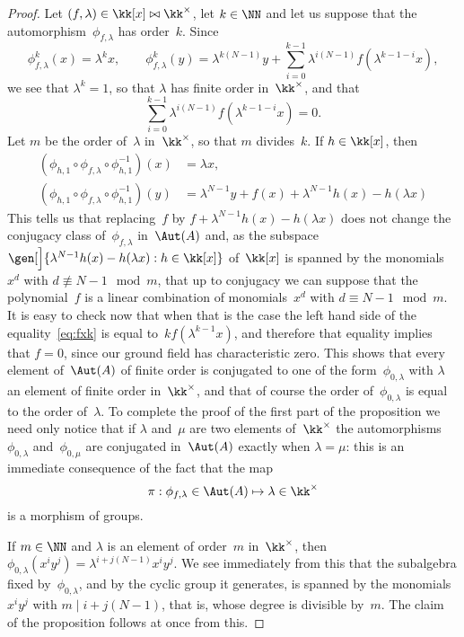 \begin{proof}
Let $(f,\lambda)\in\kk[x]\bowtie\kk^\times$, let $k\in\NN$ and let us
suppose that the automorphism~$\phi_{f,\lambda}$ has order~$k$. Since
  \[
  \phi_{f,\lambda}^k(x) = \lambda^kx,
  \qquad
  \phi_{f,\lambda}^k(y) = \lambda^{k(N-1)}y
        + \sum_{i=0}^{k-1}\lambda^{i(N-1)}f(\lambda^{k-1-i}x),
  \]
we see that $\lambda^k=1$, so that $\lambda$ has finite order
in~$\kk^\times$, and that 
  \[ \label{eq:fxk}
  \sum_{i=0}^{k-1}\lambda^{i(N-1)}f(\lambda^{k-1-i}x) = 0.
  \]
Let $m$ be the order of~$\lambda$ in~$\kk^\times$, so that $m$ divides~$k$.
If $h\in\kk[x]$, then
  \begin{align}
  (\phi_{h,1}\circ\phi_{f,\lambda}\circ\phi_{h,1}^{-1})(x)
    &= \lambda x,
    \\
  (\phi_{h,1}\circ\phi_{f,\lambda}\circ\phi_{h,1}^{-1})(y)
    &= \lambda^{N-1}y+f(x)+\lambda^{N-1}h(x)-h(\lambda x)
  \end{align}
This tells us that replacing~$f$ by
$f+\lambda^{N-1}h(x)-h(\lambda x)$ does not change the conjugacy class
of~$\phi_{f,\lambda}$ in~$\Aut(A)$ and,
as the subspace 
  \(
  \gen[\Big]{\lambda^{N-1}h(x)-h(\lambda x):h\in\kk[x]}
  \)
of~$\kk[x]$ is spanned by the monomials $x^d$ with $d\not\equiv N-1\mod m$,
that up to conjugacy we can suppose that the polynomial~$f$ is a linear
combination of monomials~$x^d$ with $d\equiv N-1\mod m$. It is easy to
check now that when that is the case the left hand side of the
equality~\eqref{eq:fxk} is equal to~$kf(\lambda^{k-1}x)$, and therefore
that equality implies that $f=0$, since our ground field has
characteristic zero. This shows that every element of~$\Aut(A)$ of finite
order is conjugated to one of the form~$\phi_{0,\lambda}$ with $\lambda$ an
element of finite order in~$\kk^\times$, and that of course the order
of~$\phi_{0,\lambda}$ is equal to the order of~$\lambda$. To complete the
proof of the first part of the proposition we need only notice that if
$\lambda$ and~$\mu$ are two elements of~$\kk^\times$ the automorphisms
$\phi_{0,\lambda}$ and~$\phi_{0,\mu}$ are conjugated in~$\Aut(A)$ exactly
when $\lambda=\mu$: this is an immediate consequence of the fact that the
map 
  \[ \label{eq:pi}
  \pi:\phi_{f,\lambda}\in\Aut(A)\mapsto\lambda\in\kk^\times
  \]
is a morphism of groups.

If $m\in\NN$ and $\lambda$ is an element of order~$m$ in~$\kk^\times$, then
$\phi_{0,\lambda}(x^iy^j)=\lambda^{i+j(N-1)}x^iy^j$. We see immediately
from this that the subalgebra fixed by~$\phi_{0,\lambda}$, and by the
cyclic group it generates, is spanned by the monomials~$x^iy^j$ with $m\mid
i+j(N-1)$, that is, whose degree is divisible by~$m$. The claim~
of the proposition follows at once from this.


\end{proof}

